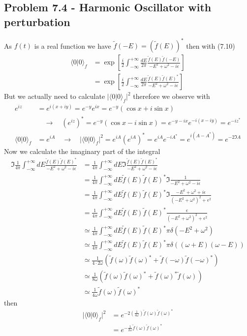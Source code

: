 \documentclass[10pt,a4paper]{book}
\theoremstyle{definition}
\begin{document}
\subsection{Problem 7.4 - Harmonic Oscillator with perturbation}
As $f(t)$ is a real function we have $\tilde f(-E)=(\tilde f(E))^*$ then with (7.10)
\begin{align}
\langle0|0\rangle_f
&=\exp\left[\frac{i}{2}\int_{-\infty}^{+\infty}\frac{dE}{2\pi}\frac{\tilde f(E)\tilde f(-E)}{-E^2+\omega^2-i\epsilon}\right]\\
&=\exp\left[\frac{i}{2}\int_{-\infty}^{+\infty}\frac{dE}{2\pi}\frac{\tilde f(E)\tilde f(E)^*}{-E^2+\omega^2-i\epsilon}\right]
\end{align}
But we actually need to calculate $|\langle0|0\rangle_f|^2$ therefore we observe with
\begin{align}
e^{iz}&=e^{i(x+iy)}=e^{-y}e^{ix}=e^{-y}(\cos x+i\sin x)\\
&\quad\rightarrow\quad (e^{iz})^*=e^{-y}(\cos x-i\sin x)=e^{-y-ix}e^{-i(x-iy)}=e^{-iz^*}\\
\langle0|0\rangle_f&=e^{iA}\quad\rightarrow\quad|\langle0|0\rangle_f|^2=e^{iA}(e^{iA})^*=e^{iA}e^{-iA^*}=e^{i(A-A^*)}=e^{-2\Im A}
\end{align}
Now we calculate the imaginary part of the integral
\begin{align}
\Im\frac{1}{4\pi}\int_{-\infty}^{+\infty}dE\frac{\tilde f(E)\tilde f(E)^*}{-E^2+\omega^2-i\epsilon}
&=\frac{1}{4\pi}\int_{-\infty}^{+\infty}dE\Im\frac{\tilde f(E)\tilde f(E)^*}{-E^2+\omega^2-i\epsilon}\\
&=\frac{1}{4\pi}\int_{-\infty}^{+\infty}dE\tilde f(E)\tilde f(E)^*\Im\frac{1}{-E^2+\omega^2-i\epsilon}\\
&=\frac{1}{4\pi}\int_{-\infty}^{+\infty}dE\tilde f(E)\tilde f(E)^*\Im\frac{-E^2+\omega^2+i\epsilon}{(-E^2+\omega^2)^2+\epsilon^2}\\
&=\frac{1}{4\pi}\int_{-\infty}^{+\infty}dE\tilde f(E)\tilde f(E)^*\frac{\epsilon}{(-E^2+\omega^2)^2+\epsilon^2}\\
&\simeq\frac{1}{4\pi}\int_{-\infty}^{+\infty}dE\tilde f(E)\tilde f(E)^*\pi\delta(-E^2+\omega^2)\\
&\simeq\frac{1}{4\pi}\int_{-\infty}^{+\infty}dE\tilde f(E)\tilde f(E)^*\pi\delta((\omega+E)(\omega-E))\\
&\simeq\frac{1}{4\cdot 2\omega}(\tilde f(\omega)\tilde f(\omega)^*+\tilde f(-\omega)\tilde f(-\omega)^*)\\
&\simeq\frac{1}{8\omega}(\tilde f(\omega)\tilde f(\omega)^*+\tilde f(\omega)^*\tilde f(\omega))\\
&\simeq\frac{1}{4\omega}\tilde f(\omega)\tilde f(\omega)^*
\end{align}
then
\begin{align}
|\langle0|0\rangle_f|^2
&=e^{-2\left(\frac{1}{4\omega}\right)\tilde f(\omega)\tilde f(\omega)^*}\\
&=e^{-\frac{1}{2\omega}\tilde f(\omega)\tilde f(\omega)^*}\\
\end{align}
\end{document}
